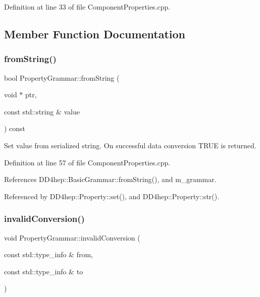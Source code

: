 Definition at line 33 of file Component\+Properties.\+cpp.



\subsection{Member Function Documentation}
\hypertarget{class_d_d4hep_1_1_property_grammar_ac0c3cd97e12d8bbbff7618fea05cbc60}{}\label{class_d_d4hep_1_1_property_grammar_ac0c3cd97e12d8bbbff7618fea05cbc60} 
\subsubsection{\texorpdfstring{from\+String()}{fromString()}}
{\footnotesize\ttfamily bool Property\+Grammar\+::from\+String (\begin{DoxyParamCaption}\item[{void $\ast$}]{ptr,  }\item[{const std\+::string \&}]{value }\end{DoxyParamCaption}) const\hspace{0.3cm}{\ttfamily [virtual]}}



Set value from serialized string. On successful data conversion T\+R\+UE is returned. 



Definition at line 57 of file Component\+Properties.\+cpp.



References D\+D4hep\+::\+Basic\+Grammar\+::from\+String(), and m\+\_\+grammar.



Referenced by D\+D4hep\+::\+Property\+::set(), and D\+D4hep\+::\+Property\+::str().

\hypertarget{class_d_d4hep_1_1_property_grammar_ac36bdd6df04d3f26daff768377e1583a}{}\label{class_d_d4hep_1_1_property_grammar_ac36bdd6df04d3f26daff768377e1583a} 
\subsubsection{\texorpdfstring{invalid\+Conversion()}{invalidConversion()}\hspace{0.1cm}{\footnotesize\ttfamily [1/2]}}
{\footnotesize\ttfamily void Property\+Grammar\+::invalid\+Conversion (\begin{DoxyParamCaption}\item[{const std\+::type\+\_\+info \&}]{from,  }\item[{const std\+::type\+\_\+info \&}]{to }\end{DoxyParamCaption})\hspace{0.3cm}{\ttfamily [static]}}



